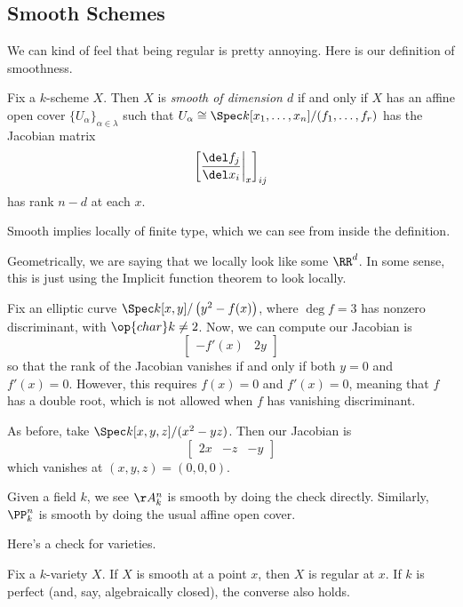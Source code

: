 \documentclass[../notes.tex]{subfiles}
\begin{document}
\subsection{Smooth Schemes}
We can kind of feel that being regular is pretty annoying. Here is our definition of smoothness.
\begin{definition}[Smooth]
	Fix a $k$-scheme $X$. Then $X$ is \textit{smooth of dimension $d$} if and only if $X$ has an affine open cover $\{U_\alpha\}_{\alpha\in\lambda}$ such that $U_\alpha\cong\Spec k[x_1,\ldots,x_n]/(f_1,\ldots,f_r)$ has the Jacobian matrix
	\[\left[\frac{\del f_j}{\del x_i}\bigg|_x\right]_{ij}\]
	has rank $n-d$ at each $x$.
\end{definition}
\begin{remark}
	Smooth implies locally of finite type, which we can see from inside the definition.
\end{remark}
\begin{remark}
	Geometrically, we are saying that we locally look like some $\RR^d$. In some sense, this is just using the Implicit function theorem to look locally.
\end{remark}
\begin{example}
	Fix an elliptic curve $\Spec k[x,y]/\left(y^2-f(x)\right)$, where $\deg f=3$ has nonzero discriminant, with $\op{char}k\ne2$. Now, we can compute our Jacobian is
	\[\begin{bmatrix}
		-f'(x) & 2y
	\end{bmatrix}\]
	so that the rank of the Jacobian vanishes if and only if both $y=0$ and $f'(x)=0$. However, this requires $f(x)=0$ and $f'(x)=0$, meaning that $f$ has a double root, which is not allowed when $f$ has vanishing discriminant.
\end{example}
\begin{nex}
	As before, take $\Spec k[x,y,z]/(x^2-yz)$. Then our Jacobian is
	\[\begin{bmatrix}
		2x & -z & -y
	\end{bmatrix}\]
	which vanishes at $(x,y,z)=(0,0,0)$.
\end{nex}
\begin{example}
	Given a field $k$, we see $\AA^n_k$ is smooth by doing the check directly. Similarly, $\PP^n_k$ is smooth by doing the usual affine open cover.
\end{example}
Here's a check for varieties.
\begin{proposition}
	Fix a $k$-variety $X$. If $X$ is smooth at a point $x$, then $X$ is regular at $x$. If $k$ is perfect (and, say, algebraically closed), the converse also holds.
\end{proposition}
\end{document}
